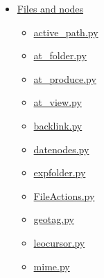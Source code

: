 \documentclass[a4paper,10pt,english]{sphinxmanual}
\begin{document}
{\begin{minipage}{0.95\linewidth}
\begin{itemize}
\begin{itemize}
\begin{itemize}
\begin{itemize}
\item {} 
{\hyperref[plugins:mod-tempfname-py]{mod\_tempfname.py}}

\item {} 
{\hyperref[plugins:open-shell-py]{open\_shell.py}}

\item {} 
{\hyperref[plugins:tomboy-import-py]{tomboy\_import.py}}

\item {} 
{\hyperref[plugins:vim-py]{vim.py}}

\item {} 
{\hyperref[plugins:xemacs-py]{xemacs.py}}

\item {} 
{\hyperref[plugins:word-export-py]{word\_export.py}}

\end{itemize}

\item {} 
{\hyperref[plugins:files-and-nodes]{Files and nodes}}
\begin{itemize}
\item {} 
{\hyperref[plugins:active-path-py]{active\_path.py}}

\item {} 
{\hyperref[plugins:at-folder-py]{at\_folder.py}}

\item {} 
{\hyperref[plugins:at-produce-py]{at\_produce.py}}

\item {} 
{\hyperref[plugins:at-view-py]{at\_view.py}}

\item {} 
{\hyperref[plugins:backlink-py]{backlink.py}}

\item {} 
{\hyperref[plugins:datenodes-py]{datenodes.py}}

\item {} 
{\hyperref[plugins:expfolder-py]{expfolder.py}}

\item {} 
{\hyperref[plugins:fileactions-py]{FileActions.py}}

\item {} 
{\hyperref[plugins:geotag-py]{geotag.py}}

\item {} 
{\hyperref[plugins:leocursor-py]{leocursor.py}}

\item {} 
{\hyperref[plugins:mime-py]{mime.py}}


\end{itemize}
\end{itemize}
\end{itemize}
\end{itemize}
\end{minipage}}
\end{document}
